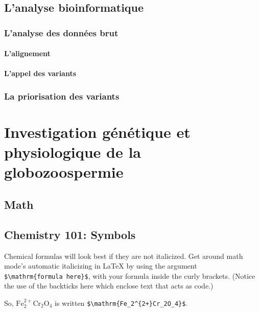\documentclass[12pt,twoside]{reedthesis}
\theoremstyle{definition}
\theoremstyle{definition}
\theoremstyle{remark}
\begin{document}
  \section{L'analyse bioinformatique}\label{lanalyse-bioinformatique}
  
  \subsection{L'analyse des données brut}\label{lanalyse-des-donnees-brut}
  
  \subsubsection{L'alignement}\label{lalignement}
  
  \subsubsection{L'appel des variants}\label{lappel-des-variants}
  
  \subsection{La priorisation des
  variants}\label{la-priorisation-des-variants}
  
  \chapter{Investigation génétique et physiologique de la
  globozoospermie}\label{globo}
  
  \section{Math}\label{math}
  
  \section{Chemistry 101: Symbols}\label{chemistry-101-symbols}
  
  Chemical formulas will look best if they are not italicized. Get around
  math mode's automatic italicizing in LaTeX by using the argument
  \texttt{\$\textbackslash{}mathrm\{formula\ here\}\$}, with your formula
  inside the curly brackets. (Notice the use of the backticks here which
  enclose text that acts as code.)
  
  So, \(\mathrm{Fe_2^{2+}Cr_2O_4}\) is written
  \texttt{\$\textbackslash{}mathrm\{Fe\_2\^{}\{2+\}Cr\_2O\_4\}\$}.
  
\end{document}
